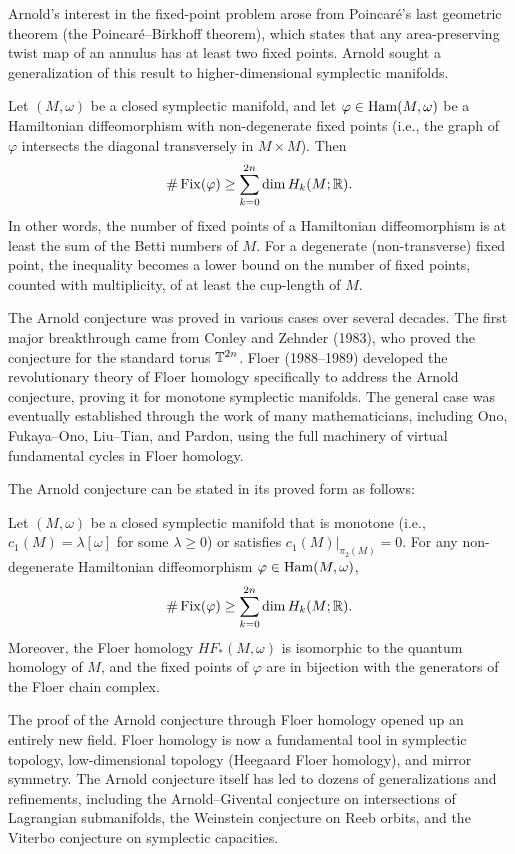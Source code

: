 Arnold's interest in the fixed-point problem arose from Poincar\'e's last geometric theorem (the Poincar\'e--Birkhoff theorem), which states that any area-preserving twist map of an annulus has at least two fixed points. Arnold sought a generalization of this result to higher-dimensional symplectic manifolds.

\begin{theorem}
Let \((M,\omega)\) be a closed symplectic manifold, and let \(\varphi \in \operatorname{Ham}(M,\omega)\) be a Hamiltonian diffeomorphism with non-degenerate fixed points (i.e., the graph of \(\varphi\) intersects the diagonal transversely in \(M \times M\)). Then
\[
\#\operatorname{Fix}(\varphi) \geq \sum_{k=0}^{2n} \dim H_k(M; \mathbb{R}).
\]
In other words, the number of fixed points of a Hamiltonian diffeomorphism is at least the sum of the Betti numbers of \(M\). For a degenerate (non-transverse) fixed point, the inequality becomes a lower bound on the number of fixed points, counted with multiplicity, of at least the cup-length of \(M\).
\end{theorem}

The Arnold conjecture was proved in various cases over several decades. The first major breakthrough came from Conley and Zehnder (1983), who proved the conjecture for the standard torus \(\mathbb{T}^{2n}\). Floer (1988--1989) developed the revolutionary theory of Floer homology specifically to address the Arnold conjecture, proving it for monotone symplectic manifolds. The general case was eventually established through the work of many mathematicians, including Ono, Fukaya--Ono, Liu--Tian, and Pardon, using the full machinery of virtual fundamental cycles in Floer homology.

The Arnold conjecture can be stated in its proved form as follows:

\begin{theorem}
Let \((M,\omega)\) be a closed symplectic manifold that is monotone (i.e., \(c_1(M) = \lambda[\omega]\) for some \(\lambda \geq 0\)) or satisfies \(c_1(M)|_{\pi_2(M)} = 0\). For any non-degenerate Hamiltonian diffeomorphism \(\varphi \in \operatorname{Ham}(M,\omega)\),
\[
\#\operatorname{Fix}(\varphi) \geq \sum_{k=0}^{2n} \dim H_k(M; \mathbb{R}).
\]
Moreover, the Floer homology \(HF_*(M,\omega)\) is isomorphic to the quantum homology of \(M\), and the fixed points of \(\varphi\) are in bijection with the generators of the Floer chain complex.
\end{theorem}

The proof of the Arnold conjecture through Floer homology opened up an entirely new field. Floer homology is now a fundamental tool in symplectic topology, low-dimensional topology (Heegaard Floer homology), and mirror symmetry. The Arnold conjecture itself has led to dozens of generalizations and refinements, including the Arnold--Givental conjecture on intersections of Lagrangian submanifolds, the Weinstein conjecture on Reeb orbits, and the Viterbo conjecture on symplectic capacities.


